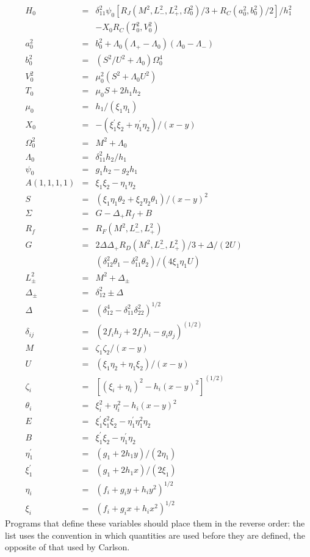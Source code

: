 \documentclass[12pt]{article}
\begin{document}
\begin{eqnarray*}
  H_0 & = &  \delta_{11}^2\psi_0 [
			R_J(M^2,L_{-}^2,L_{+}^2,\Omega_0^2)/3
			+R_C(a_0^2,b_0^2)/2]/h_1^2 \\
	&  &		-X_0R_C(T_0^2,V_0^2) \\
  a_0^2 & = & b_0^2 + \Lambda_0(\Lambda_{+} - \Lambda_0)
			(\Lambda_0 - \Lambda_{-}) \\
  b_0^2 & = &  (S^2/U^2 + \Lambda_0)\Omega_0^4 \\
  V_0^2 & = & \mu_0^2(S^2 + \Lambda_0U^2)  \\
  T_0 & = & \mu_0S + 2h_1h_2  \\
  \mu_0 & = & h_1/(\xi_1\eta_1)  \\
  X_0 & = & -(\xi_1^\prime\xi_2 + \eta_1^\prime\eta_2)/(x-y) \\
  \Omega_0^2 & = & M^2 + \Lambda_0  \\
  \Lambda_0 & = &  \delta_{11}^2h_2/h_1 \\
  \psi_0 & = & g_1h_2 - g_2h_1 \\
  A(1,1,1,1) & = & \xi_1\xi_2 - \eta_1\eta_2  \\
  S & = & (\xi_1\eta_1\theta_2 + \xi_2\eta_2\theta_1)/(x-y)^2 \\
  \Sigma & = & G-\Delta_{+}R_f + B  \\
  R_f & = & R_F(M^2,L_{-}^2, L_{+}^2)  \\
  G & = & 2\Delta\Delta_{+}R_D(M^2,L_{-}^2,L_{+}^2)/3 + \Delta/(2U) \\
    & &	 (\delta_{12}^2\theta_1 - \delta_{11}^2\theta_2)/(4\xi_1\eta_1U) \\
  L_{\pm}^2 & = & M^2 + \Delta_{\pm}  \\
  \Delta_{\pm} & = & \delta_{12}^2 \pm \Delta \\
  \Delta &=& (\delta_{12}^4 -\delta_{11}^2\delta_{22}^2)^{1/2} \\
  \delta_{ij} & = & (2f_ih_j + 2f_jh_i - g_ig_j)^{(1/2)}  \\
  M & = & \zeta_1\zeta_2/(x - y) \\
  U & = & (\xi_1\eta_2+\eta_1\xi_2)/(x - y)  \\
  \zeta_i & = & [(\xi_i+\eta_i)^2 - h_i(x-y)^2]^{(1/2)} \\
  \theta_i & = & \xi_i^2 + \eta_i^2 - h_i(x-y)^2  \\
  E & = & \xi_1^\prime\xi_1^2\xi_2-\eta_1^\prime\eta_1^2\eta_2 \\
  B & = & \xi_1^\prime\xi_2 - \eta_1^\prime\eta_2 \\
  \eta_1^\prime & = & (g_1 + 2h_1y)/(2\eta_1)  \\
  \xi_1^\prime & = & (g_1 + 2h_1x)/(2\xi_1)  \\
  \eta_i& = & (f_i + g_iy + h_iy^2)^{1/2}  \\
  \xi_i & = & (f_i + g_ix + h_ix^2)^{1/2}
\end{eqnarray*}
Programs that define these variables should place them in the
reverse order: the list uses the convention in which quantities
are used before they are defined, the opposite of that used by Carlson.
\end{document}
